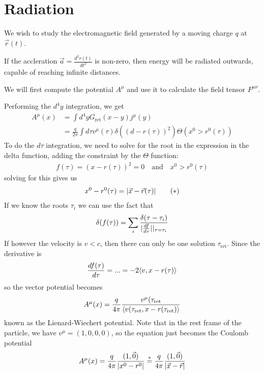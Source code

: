 \section{Radiation}

We wish to study the electromagnetic field generated by a moving charge $q$ at $\vec{r}(t)$.

If the accleration $\vec{a} = \frac{d^{2} r(t)}{dt^{2}}$ is non-zero, then energy will be radiated outwards, capable of reaching infinite distances.

We will first compute the potential $A^{\mu}$ and use it to calculate the field tensor $F^{\mu \nu}$.

Performing the $d^{4}y$ integration, we get
\begin{align*}
  A^{\mu}(x) 
  &= \int d^{4}y G_{\text{ret}}(x - y)j^{\mu}(y)\\
  &= \frac{q}{2 \pi} \int d \tau v^{\mu}(\tau) \delta\left(
    (d - r(\tau))^{2}
  \right)
  \Theta(x^{0} > r^{0}(\tau))
\end{align*}
To do the $d \tau$ integration, we need to solve for the root in the expression in the delta function, adding the constraint by the $\Theta$ function:
\begin{align*}
  f(\tau) = (x - r(\tau))^{2} = 0 \quad \text{and} \quad x^{0} > r^{0}(\tau)
\end{align*}
solving for this gives us
\begin{align*}
  x^{0} - r^{0}(\tau) = \vert\vec{x} - \vec{r}(\tau)\vert\tag{$\ast$}
\end{align*}
If we know the roots $\tau_i$ we can use the fact that
\begin{align*}
  \delta(f(\tau)) = \sum_{i} \frac{\delta(\tau - \tau_i)}{\vert\frac{d f}{d \tau}\vert|_{\tau = \tau_i}}
\end{align*}
If however the velocity is $v < c$, then there can only be one solution $\tau_{\text{ret}}$.
Since the derivative is
\begin{align*}
  \frac{d f(\tau)}{d \tau} 
  = ...
  = - 2 \langle v, x - r(\tau)\rangle
\end{align*}
so the vector potential becomes
\begin{align*}
  A^{\mu}(x) = \frac{q}{4 \pi} \frac{v^{\mu}(\tau_{\text{ret}}}{\langle v(\tau_{\text{ret}},x - r(\tau_{\text{ret}})\rangle}
\end{align*}
known as the Lienard-Wiechert potential.
Note that in the rest frame of the particle, we have $v^{\mu} = (1,0,0,0)$, so the equation just becomes the Coulomb potential
\begin{align*}
  A^{\mu}(x) 
  = \frac{q}{4 \pi} \frac{(1,\vec{0})}{\vert x^{0} - r^{0}\vert}
  \stackrel{\ast}{=} \frac{q}{4 \pi} \frac{(1,\vec{0})}{\vert\vec{x} - \vec{r}\vert}
\end{align*}

